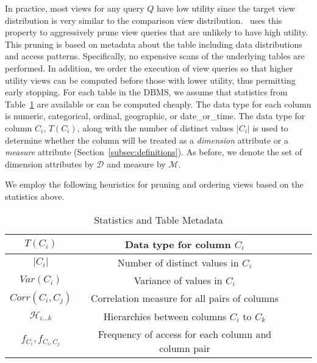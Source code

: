 

In practice, most views for any query $Q$ have low utility since the target view
distribution is very similar to the comparison view distribution. 
\SeeDB\ uses this property to aggressively prune 
view queries that are unlikely to have high utility. 
This pruning is based on metadata about the table including data
distributions and access patterns. 
Specifically, no expensive scans of the underlying
tables are performed. In addition, we order the execution of view queries so
that higher utility views can be computed before those with lower utility,
thus permitting early stopping. For each table in the DBMS, we assume that
statistics from Table~\ref{tab:statistics} are available or can be computed
cheaply. The data type for each column is numeric, categorical, ordinal, geographic, or
date\_or\_time. The data type for column $C_i$, $T(C_i)$, along with the number
of distinct values $|C_i|$ is used to determine whether the column will be
treated as a {\it dimension} attribute or a {\it measure}
attribute (Section~\ref{subsec:definitions}). As before, we denote the set of
dimension attributes by $\mathcal{D}$ and measure by $\mathcal{M}$.

We employ the following heuristics for pruning and ordering views based on the
statistics above.

\begin{table}
{\scriptsize \center
\vspace{-10pt}
\begin{tabular}{|c|c|c|c|}
\hline
$T(C_i)$ & Data type for column $C_i$ \\ \hline
$|C_i|$ & Number of distinct values in $C_i$ \\
\hline $Var(C_i)$ & Variance of values in $C_i$ \\ \hline
$Corr(C_i, C_j)$ & Correlation measure for all pairs of columns \\ \hline
$\mathcal{H}_{i\ldots k}$ & Hierarchies between columns $C_i$ to $C_k$ \\ \hline
$f_{C_i}, f_{C_i, C_j}$ & Frequency of access for each column and column pair \\
\hline
\end{tabular} 
\vspace{-10pt}
\caption{Statistics and Table Metadata \label{tab:statistics}}
}
\end{table}

